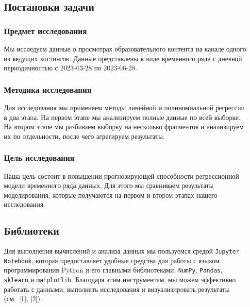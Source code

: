 \documentclass[a4paper,12pt]{article}
\begin{document}
\subsection{Постановки задачи}

\subsubsection{Предмет исследования} Мы исследуем данные о просмотрах образовательного контента на канале одного из ведущих хостингов. Данные представлены в виде временного ряда с дневной периодичностью с 2023-03-28 по 2023-06-28.
\subsubsection{Методика исследования} Для исследования мы применяем методы линейной и полиномиальной регрессии в два этапа. На первом этапе мы анализируем полные данные по всей выборке. На втором этапе мы разбиваем выборку на несколько фрагментов и анализируем их по отдельности, после чего агрегируем результаты.

\subsubsection{Цель исследования} Наша цель состоит в повышении прогнозирующей способности регрессионной модели временного ряда данных. Для этого мы сравниваем результаты моделирования, которые получаются на первом и втором этапах нашего исследования.

\subsection{Библиотеки}
Для выполнения вычислений и анализа данных мы пользуемся средой \texttt{Jupyter Notebook}, которая предоставляет удобные средства для работы с языком программирования Python и его главными библиотеками: \texttt{NumPy}, \texttt{Pandas}, \texttt{sklearn} и \texttt{matplotlib}. Благодаря этим инструментам, мы можем эффективно работать с данными, выполнять исследования и визуализировать результаты (см. [1], [2]).

%
%
\end{document}
